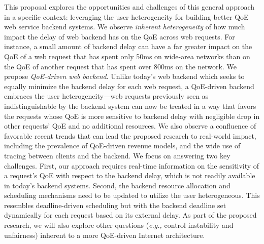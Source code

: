 \documentclass{proposalnsf}
\newcommand{\eg}{{\it e.g.,}\xspace}
\begin{document}
This proposal explores the opportunities and challenges of this general approach in a specific context: leveraging the user heterogeneity for building better QoE web service backend systems.
We observe {\em inherent heterogeneity} of how much impact the delay of web backend has on the QoE across web requests.
For instance, a small amount of backend delay can have a far greater impact on the QoE of a web request that has spent only 50ms on wide-area networks than on the QoE of another request that has spent over 800ms on the network.
We propose {\em QoE-driven web backend}.
Unlike today's web backend which seeks to equally minimize the backend delay for each web request, a QoE-driven backend embraces the user heterogeneity---web requests previously seen as indistinguishable by the backend system can now be treated in a way that favors the requests whose QoE is more sensitive to backend delay with negligible drop in other requests' QoE and no additional resources.
We also observe a confluence of favorable recent trends that can lead the proposed research to real-world impact, including the prevalence of QoE-driven revenue models, and the wide use of tracing between clients and the backend.
We focus on answering two key challenges.
First, our approach requires real-time information on the sensitivity of a request's QoE with respect to the backend delay, which is not readily available in today's backend systems.
Second, the backend resource allocation and scheduling mechanisms need to be updated to utilize the user heterogeneous. This resembles deadline-driven scheduling but with the backend deadline set dynamically for each request based on its external delay.
As part of the proposed research, we will also explore other questions (\eg control instability and unfairness) inherent to a more QoE-driven Internet architecture.
\end{document}
